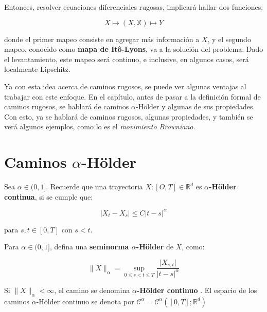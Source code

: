 Entonces, resolver ecuaciones diferenciales rugosas, implicará hallar dos funciones:

\[
	X \mapsto (X, \mathbb{X}) \mapsto Y
\]

donde el primer mapeo consiste en agregar más información a $X$, y el segundo mapeo, conocido como \textbf{mapa de Itô-Lyons}, va a la solución del problema. Dado el levantamiento, este mapeo será continuo, e inclusive, en algunos casos, será localmente Lipschitz.

Ya con esta idea acerca de caminos rugosos, se puede ver algunas ventajas al trabajar con este enfoque. En el capítulo, antes de pasar a la definición formal de caminos rugosos, se hablará de caminos $\alpha$-Hölder y algunas de sus propiedades. Con esto, ya se hablará de caminos rugosos, algunas propiedades, y también se verá algunos ejemplos, como lo es el \textit{movimiento Browniano.}









\section{Caminos $\alpha$-Hölder}


Sea $\alpha \in (0, 1]$. Recuerde que una trayectoria $X: [O, T] \in \mathbb{R}^d$ es $\alpha$\textbf{-Hölder continua}, si se cumple que:

\[
	\lvert X_t - X_s \rvert \leq C \lvert t - s \rvert^{\alpha}
\]

para $s, t \in [0,T]$ con $s < t$.

\begin{boxDef}
	Para $\alpha \in (0, 1]$, defina una \textbf{seminorma $\alpha$-Hölder} de $X$, como:

	\[
		\lVert X \rVert_{\alpha} = \sup_{0 \leq s < t \leq T} \frac{ \lvert X_{s,t} \rvert }{ \lvert t - s \rvert^{\alpha} }
	\]

	Si $\lVert X \rVert_{\alpha} < \infty$, el camino se denomina \textbf{ $\alpha$-Hölder continuo }. El espacio de los caminos $\alpha$-Hölder continuo se denota por $\mathcal{C}^{\alpha} = \mathcal{C}^{\alpha}([0,T]; \mathbb{R}^d) $

\end{boxDef}






